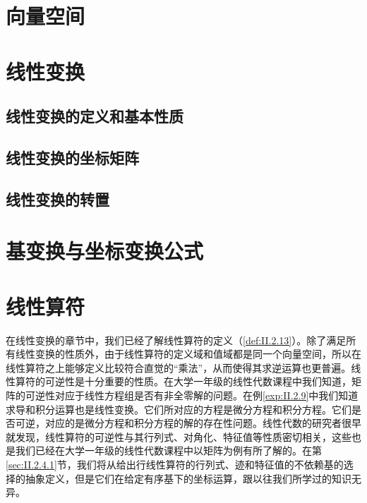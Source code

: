 \documentclass[zihao=-4,linespread=1.5,a4paper,heading=true,twoside]{ctexbook}
\theoremstyle{definition}
\theoremstyle{plain}
\begin{document}
\section{向量空间}\label{sec:II.2.1}


\section{线性变换}\label{sec:II.2.2}
\subsection{线性变换的定义和基本性质}\label{sec:II.2.2.1}


\subsection{线性变换的坐标矩阵}\label{sec:II.2.2.2}


\subsection{线性变换的转置}\label{sec:II.2.2.3}


\section{基变换与坐标变换公式}\label{sec:II.2.3}


\section{线性算符}\label{sec:II.2.4}
在线性变换的章节中，我们已经了解线性算符的定义（\ref{def:II.2.13}）。除了满足所有线性变换的性质外，由于线性算符的定义域和值域都是同一个向量空间，所以在线性算符之上能够定义比较符合直觉的“乘法”，从而使得其求逆运算也更普遍。线性算符的可逆性是十分重要的性质。在大学一年级的线性代数课程中我们知道，矩阵的可逆性对应于线性方程组是否有非全零解的问题。在例\ref{exp:II.2.9}中我们知道求导和积分运算也是线性变换。它们所对应的方程是微分方程和积分方程。它们是否可逆，对应的是微分方程和积分方程的解的存在性问题。线性代数的研究者很早就发现，线性算符的可逆性与其行列式、对角化、特征值等性质密切相关，这些也是我们已经在大学一年级的线性代数课程中以矩阵为例有所了解的。在第\ref{sec:II.2.4.1}节，我们将从给出行线性算符的行列式、迹和特征值的不依赖基的选择的抽象定义，但是它们在给定有序基下的坐标运算，跟以往我们所学过的知识无异。
\end{document}
